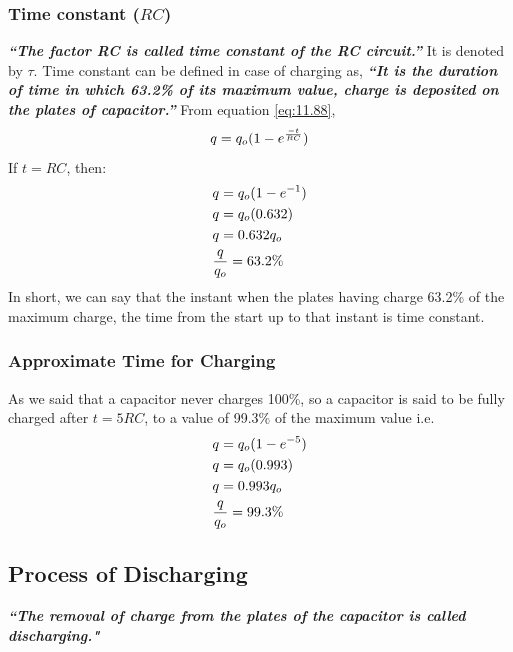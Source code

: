 \subsubsection{Time constant ($RC$)}
\textit{
  \textbf{
    “The factor RC is called time constant of the RC circuit.”
  }
} It is denoted by $\tau$.
\newline
Time constant can be defined in case of charging as, 
\textit{\textbf{“It is the duration of time in which 63.2\% of
its maximum value, charge is deposited on the plates of capacitor.”}}
From equation \ref{eq:11.88}, 
\begin{equation}\notag
  q = q_{o}(1-e^{\frac{-t}{RC}})
\end{equation}
If $t = RC$, then:
\begin{equation}\notag
  \begin{split}
    &q = q_{o}(1-e^{-1}) \\
    &q = q_{o}(0.632)\\
   &q = 0.632 q_{o}\\
  &\frac{q}{q_{o}} = 63.2\%
  \end{split}
\end{equation}
In short, we can say that the instant when the plates having charge 63.2\%
of the maximum charge, the time from the start up to that instant is time
constant.
\subsubsection{Approximate Time for Charging}
As we said that a capacitor never charges 100\%,
so a capacitor is said to be fully charged after $t = 5RC$,
to a value of 99.3\% of the maximum value i.e.
\begin{equation}\notag
  \begin{split}
    &q = q_{o}(1-e^{-5}) \\
    &q = q_{o}(0.993)\\
   &q = 0.993 q_{o}\\
  &\frac{q}{q_{o}} = 99.3\%
  \end{split}
\end{equation}
\subsection{Process of Discharging}
\textit{
  \textbf{
    ``The removal of charge from the plates of the capacitor
    is called discharging."
  }
}

